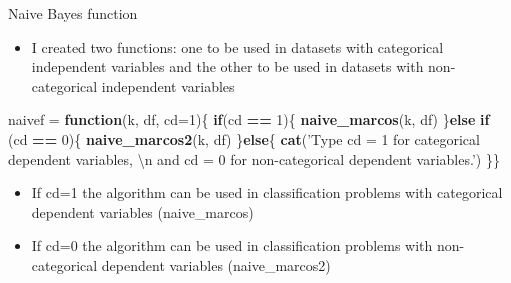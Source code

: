 \documentclass[
  10pt,
  ignorenonframetext,
]{beamer}
\newenvironment{Shaded}{\begin{snugshade}}{\end{snugshade}}
\newcommand{\CharTok}[1]{\textcolor[rgb]{0.31,0.60,0.02}{#1}}
\newcommand{\ControlFlowTok}[1]{\textcolor[rgb]{0.13,0.29,0.53}{\textbf{#1}}}
\newcommand{\DataTypeTok}[1]{\textcolor[rgb]{0.13,0.29,0.53}{#1}}
\newcommand{\DecValTok}[1]{\textcolor[rgb]{0.00,0.00,0.81}{#1}}
\newcommand{\KeywordTok}[1]{\textcolor[rgb]{0.13,0.29,0.53}{\textbf{#1}}}
\newcommand{\NormalTok}[1]{#1}
\newcommand{\OperatorTok}[1]{\textcolor[rgb]{0.81,0.36,0.00}{\textbf{#1}}}
\newcommand{\StringTok}[1]{\textcolor[rgb]{0.31,0.60,0.02}{#1}}
\providecommand{\tightlist}{%
  \setlength{\itemsep}{0pt}\setlength{\parskip}{0pt}}
\begin{document}
\begin{frame}[fragile]{Naive Bayes function}
\protect\hypertarget{naive-bayes-function}{}

\begin{itemize}
\tightlist
\item
  I created two functions: one to be used in datasets with categorical
  independent variables and the other to be used in datasets with
  non-categorical independent variables
\end{itemize}

\begin{Shaded}
\begin{Highlighting}[]
\NormalTok{naivef =}\StringTok{ }\ControlFlowTok{function}\NormalTok{(k, df, }\DataTypeTok{cd=}\DecValTok{1}\NormalTok{)\{}
    \ControlFlowTok{if}\NormalTok{(cd }\OperatorTok{==}\StringTok{ }\DecValTok{1}\NormalTok{)\{}
      \KeywordTok{naive_marcos}\NormalTok{(k, df)}
\NormalTok{    \}}\ControlFlowTok{else} \ControlFlowTok{if}\NormalTok{ (cd }\OperatorTok{==}\StringTok{ }\DecValTok{0}\NormalTok{)\{}
      \KeywordTok{naive_marcos2}\NormalTok{(k, df)}
\NormalTok{    \}}\ControlFlowTok{else}\NormalTok{\{}
      \KeywordTok{cat}\NormalTok{(}\StringTok{'Type cd = 1 for categorical dependent variables, }\CharTok{\textbackslash{}n}
\StringTok{      and cd = 0 for non-categorical dependent variables.'}\NormalTok{)}
\NormalTok{    \}\} }
\end{Highlighting}
\end{Shaded}

\begin{itemize}
\tightlist
\item
  If cd=1 the algorithm can be used in classification problems with
  categorical dependent variables (naive\_marcos)
\item
  If cd=0 the algorithm can be used in classification problems with
  non-categorical dependent variables (naive\_marcos2)
\end{itemize}

\end{frame}
\end{document}
